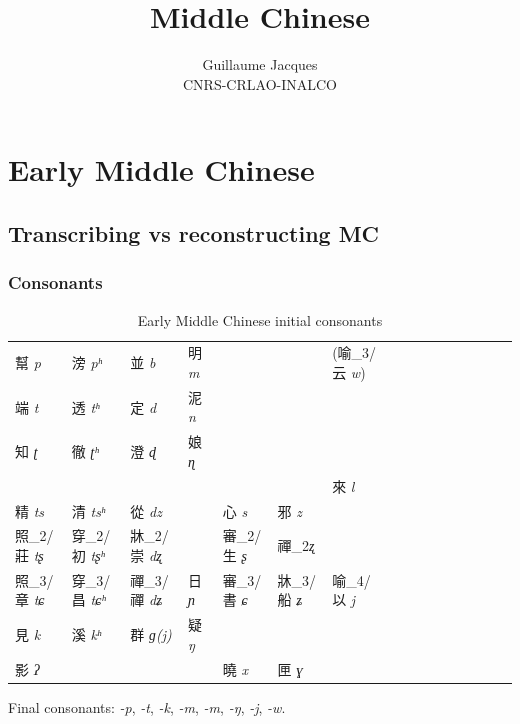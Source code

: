 \documentclass[oneside,a4paper,11pt]{article}
\newcommand{\ipa}[1]{{\phon\textit{#1}}}
\newcommand{\zh}[1]{{\cn #1}}
\newcommand{\zhc}[2]{\zh{#1} \ipa{#2}}
\begin{document}
 
\title{Middle Chinese}
\author{Guillaume Jacques\\ CNRS-CRLAO-INALCO}
\maketitle

\section{Early Middle Chinese} \label{sec:emc}

\subsection{Transcribing vs reconstructing MC}

\subsubsection{Consonants}
\begin{table}[H]
\caption{Early Middle Chinese initial consonants} \label{tab:mc.onset}
\begin{tabular}{llllllllllllllll}
\toprule
 	\zhc{幫}{p} & 	\zhc{滂}{pʰ} & 	\zhc{並}{b} & 	\zhc{明}{m} & 	 & 	 & (\zh{喻}_3/\zhc{云}{w})	 & 	\\
  	\zhc{端}{t} & 	\zhc{透}{tʰ} & 	\zhc{定}{d} & 	\zhc{泥}{n} & 	 & 	 & 	 & 	\\
 	\zhc{知}{ʈ} & 	\zhc{徹}{ʈʰ} & 	\zhc{澄}{ɖ} & 	\zhc{娘}{ɳ} & 	 & 	 & 	 & 	\\
  	 & 	 & 	 & 	 & 	 & 	 & 	\zhc{來}{l} & 	\\
  	\zhc{精}{ts} & 	\zhc{清}{tsʰ} & 	\zhc{從}{dz} & 	 & 	\zhc{心}{s} & 	\zhc{邪}{z} & 	 & 	\\
  	\zh{照}_2/\zhc{莊}{tʂ} & 	\zh{穿}_2/\zhc{初}{tʂʰ} & 	\zh{牀}_2/\zhc{崇}{dʐ} & 	 & 	  	\zh{審}_2/\zhc{生}{ʂ} & 	 \zh{禪}_2\ipa{ʐ} & 	 & 	\\
 	  	\zh{照}_3/\zhc{章}{tɕ} & 	\zh{穿}_3/\zhc{昌}{tɕʰ} & 	\zh{禪}_3/\zhc{禪}{dʑ} & 	\zhc{日}{ɲ} & 	\zh{審}_3/\zhc{書}{ɕ} & 	\zh{牀}_3/\zhc{船}{ʑ} & 	\zh{喻}_4/\zhc{以}{j} & 	\\
 	\zhc{見}{k} & 	\zhc{溪}{kʰ} & 	\zhc{群}{ɡ(j)} & 	\zhc{疑}{ŋ} & 	 & 	 & 	 & 	\\
 	\zhc{影}{ʔ} & 	 & 	 & 	 & 	\zhc{曉}{x} & 	\zhc{匣}{ɣ} & 	 & 	\\
\bottomrule
\end{tabular}
\end{table}

Final consonants: \ipa{-p},  \ipa{-t},  \ipa{-k},  \ipa{-m},  \ipa{-m},  \ipa{-ŋ}, \ipa{-j}, \ipa{-w}.
\end{document}
